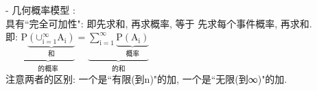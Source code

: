 \documentclass[UTF8]{ctexart}
\begin{document}
- 几何概率模型 : \\
具有``完全可加性":  即先求和, 再求概率, 等于 先求每个事件概率, 再求和. \\
即: $
\underset{\text{的概率}}{\underbrace{\text{P}\underset{\text{和}}{\underbrace{\left( \text{∪}_{\text{i}=1}^{\infty}\text{A}_{\text{i}} \right) }}}}=\underset{\text{的和}}{\underbrace{\sum_{\text{i}=1}^{\infty}{\underset{\text{概率}}{\underbrace{\text{P}\left( \text{A}_{\text{i}} \right) }}}}}
$ \\

注意两者的区别: 一个是``有限(到n)"的加,  一个是``无限(到∞)"的加.

	
\end{document}
